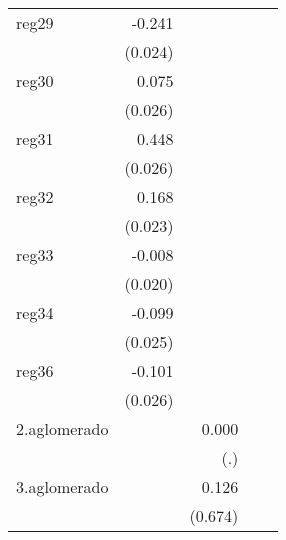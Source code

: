 {\begin{longtable}{l*{4}{D{.}{.}{-1}}}
\addlinespace
reg29       &      -0.241\sym{***}&                     &                     &                     \\
            &     (0.024)         &                     &                     &                     \\
\addlinespace
reg30       &       0.075\sym{**} &                     &                     &                     \\
            &     (0.026)         &                     &                     &                     \\
\addlinespace
reg31       &       0.448\sym{***}&                     &                     &                     \\
            &     (0.026)         &                     &                     &                     \\
\addlinespace
reg32       &       0.168\sym{***}&                     &                     &                     \\
            &     (0.023)         &                     &                     &                     \\
\addlinespace
reg33       &      -0.008         &                     &                     &                     \\
            &     (0.020)         &                     &                     &                     \\
\addlinespace
reg34       &      -0.099\sym{***}&                     &                     &                     \\
            &     (0.025)         &                     &                     &                     \\
\addlinespace
reg36       &      -0.101\sym{***}&                     &                     &                     \\
            &     (0.026)         &                     &                     &                     \\
\addlinespace
2.aglomerado&                     &       0.000         &                     &                     \\
            &                     &         (.)         &                     &                     \\
\addlinespace
3.aglomerado&                     &       0.126         &                     &                     \\
            &                     &     (0.674)         &                     &                     \\

\end{longtable}}
